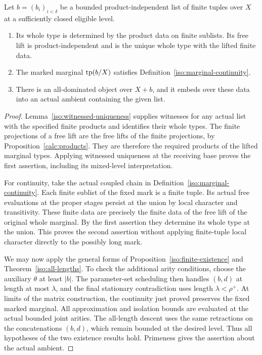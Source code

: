 \begin{theorem}\label{iso:independent-lists}
Let $b=(b_i)_{i<\delta}$ be a bounded product-independent list of
finite tuples over $X$ at a sufficiently closed eligible level.
\begin{enumerate}
\item Its whole type is determined by the product data on finite
sublists. Its free lift is product-independent and is the unique
whole type with the lifted finite data.
\item The marked marginal $\operatorname{tp}(b/X)$ satisfies
Definition~\ref{iso:marginal-continuity}.
\item There is an all-dominated object over $X+b$, and it embeds
over these data into an actual ambient containing the given list.
\end{enumerate}
\end{theorem}

\begin{proof}
Lemma~\ref{iso:witnessed-uniqueness} supplies witnesses for any actual
list with the specified finite products and identifies their whole
types. The finite projections of a free lift are the free lifts of
the finite projections, by Proposition~\ref{calc:products}. They are
therefore the required products of the lifted marginal types.
Applying witnessed uniqueness at the receiving base proves the
first assertion, including its mixed-level interpretation.

For continuity, take the actual coupled chain in
Definition~\ref{iso:marginal-continuity}. Each finite sublist of the
fixed mark is a finite tuple. Its actual free evaluations at the
proper stages persist at the union by local character and
transitivity. These finite data are precisely the finite data of
the free lift of the original whole marginal. By the first
assertion they determine its whole type at the union. This proves
the second assertion without applying finite-tuple local character
directly to the possibly long mark.

We may now apply the general forms of
Proposition~\ref{iso:finite-existence} and
Theorem~\ref{iso:all-lengths}. To check the additional arity
conditions, choose the auxiliary $\theta$ at least $|b|$. The
parameter-set scheduling then handles $(b,d)$ at length at most
$\lambda$, and the final stationary contradiction uses length
$\lambda<\rho^+$. At limits of the matrix construction, the
continuity just proved preserves the fixed marked marginal.
All approximation and isolation bounds are evaluated at the actual
bounded joint arities. The all-length descent uses the same
retractions on the concatenations $(b,d)$, which remain bounded at
the desired level. Thus all hypotheses of the two existence
results hold. Primeness gives the assertion about the actual
ambient.
\end{proof}
